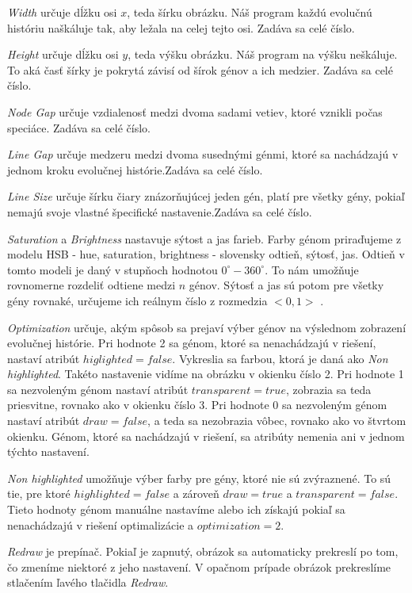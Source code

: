 \emph{Width} určuje dĺžku osi $x$, teda šírku obrázku. Náš program každú evolučnú históriu naškáluje tak, aby ležala na celej tejto osi.
Zadáva sa celé číslo.

\emph{Height} určuje dĺžku osi $y$, teda výšku obrázku. Náš program na výšku neškáluje. 
To aká časť šírky je pokrytá závisí od šírok génov a ich medzier.
Zadáva sa celé číslo.

\emph{Node Gap} určuje vzdialenosť medzi dvoma sadami vetiev, ktoré vznikli počas speciáce.
Zadáva sa celé číslo.

\emph{Line Gap} určuje medzeru medzi dvoma susednými génmi, ktoré sa nachádzajú v jednom kroku evolučnej histórie.Zadáva sa celé číslo.

\emph{Line Size} určuje šírku čiary znázorňujúcej jeden gén, platí pre všetky gény, pokiaľ nemajú svoje vlastné špecifické nastavenie.Zadáva sa celé číslo.

\emph{Saturation} a \emph{Brightness} nastavuje sýtost a jas farieb.
Farby génom priraďujeme z modelu HSB - hue, saturation, brightness - slovensky odtieň, sýtosť, jas.
Odtieň v tomto modeli je daný v stupňoch hodnotou $0^\circ-360^\circ$. To nám umožňuje rovnomerne rozdeliť odtiene medzi $n$ génov.
Sýtosť a jas sú potom pre všetky gény rovnaké, určujeme ich reálnym číslo z rozmedzia $<0,1>$ . 


\emph{Optimization} určuje, akým spôsob sa prejaví výber génov na výslednom zobrazení evolučnej histórie.
Pri hodnote 2 sa génom, ktoré sa nenachádzajú v riešení, nastaví atribút $higlighted=false$. Vykreslia sa farbou, ktorá je daná ako
\emph{Non highlighted}. Takéto nastavenie vidíme na obrázku \cite{obr:opt} v okienku číslo 2.
Pri hodnote 1 sa nezvoleným génom nastaví atribút $transparent=true$, zobrazia sa teda priesvitne, rovnako ako v okienku číslo 3.
Pri hodnote 0 sa nezvoleným génom nastaví atribút $draw=false$, a teda sa nezobrazia vôbec, rovnako ako vo štvrtom okienku.
Génom, ktoré sa nachádzajú v riešení, sa atribúty nemenia ani v jednom týchto nastavení.

\emph{Non highlighted} umožňuje výber farby pre gény, ktoré nie sú zvýraznené.
To sú tie, pre ktoré $highlighted=false$ a zároveň $draw=true$ a $transparent=false$. Tieto hodnoty génom manuálne nastavíme
alebo ich získajú pokiaľ sa nenachádzajú v riešení optimalizácie a $optimization=2$.

\emph{Redraw} je prepínač. Pokiaľ je zapnutý, obrázok sa automaticky prekreslí po tom, čo zmeníme niektoré z jeho nastavení. 
V opačnom prípade obrázok prekreslíme stlačením ľavého tlačidla \emph{Redraw}.

